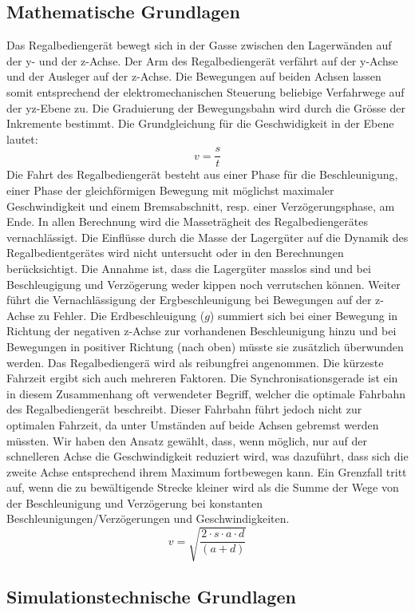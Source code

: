 \subsection{Mathematische Grundlagen}
Das Regalbediengerät bewegt sich in der Gasse zwischen den Lagerwänden auf der y- und der z-Achse. Der Arm des Regalbediengerät verfährt auf der y-Achse und der Ausleger auf der z-Achse. Die Bewegungen auf beiden Achsen lassen somit entsprechend der elektromechanischen Steuerung beliebige Verfahrwege auf der yz-Ebene zu. Die Graduierung der Bewegungsbahn wird durch die Grösse der Inkremente bestimmt.
%
Die Grundgleichung für die Geschwidigkeit in der Ebene lautet:
%
\begin{equation}
v = \frac{s}{t}
\end{equation}
%
Die Fahrt des Regalbediengerät besteht aus einer Phase für die Beschleunigung, einer Phase der gleichförmigen Bewegung mit möglichst maximaler Geschwindigkeit und einem Bremsabschnitt, resp. einer Verzögerungsphase, am Ende. In allen Berechnung wird die Masseträgheit des Regalbediengerätes vernachlässigt. Die Einflüsse durch die Masse der Lagergüter auf die Dynamik des Regalbedientgerätes wird nicht untersucht oder in den Berechnungen berücksichtigt. Die Annahme ist, dass die Lagergüter masslos sind und bei Beschleugigung und Verzögerung weder kippen noch verrutschen können. Weiter führt die Vernachlässigung der Ergbeschleunigung bei Bewegungen auf der z-Achse zu Fehler. Die Erdbeschleuigung ($ g $) summiert sich bei einer Bewegung in Richtung der negativen z-Achse zur vorhandenen Beschleunigung hinzu und bei Bewegungen in positiver Richtung (nach oben) müsste sie zusätzlich überwunden werden. Das Regalbediengerä wird als reibungfrei angenommen.
%
Die kürzeste Fahrzeit ergibt sich auch mehreren Faktoren. Die Synchronisationsgerade ist ein in diesem Zusammenhang oft verwendeter Begriff, welcher die optimale Fahrbahn des Regalbediengerät beschreibt. Dieser Fahrbahn führt jedoch nicht zur optimalen Fahrzeit, da unter Umständen auf beide Achsen gebremst werden müssten. Wir haben den Ansatz gewählt, dass, wenn möglich, nur auf der schnelleren Achse die Geschwindigkeit reduziert wird, was dazuführt, dass sich die zweite Achse entsprechend ihrem Maximum fortbewegen kann.
%
Ein Grenzfall tritt auf, wenn die zu bewältigende Strecke kleiner wird als die Summe der Wege von der Beschleunigung und Verzögerung bei konstanten Beschleunigungen/Verzögerungen und Geschwindigkeiten. 
%
\begin{equation}
v = \sqrt{\frac{2 \cdot s \cdot a \cdot d}{(a+d)}}
\end{equation}
%
\subsection{Simulationstechnische Grundlagen}
%




